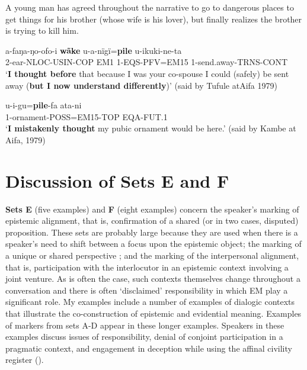 \documentclass[output=paper]{langsci/langscibook}
\begin{document}
A young man has agreed throughout the narrative to go to dangerous places to get things  for his brother (whose wife is his lover), but finally realizes the brother is trying to kill him. 

\begin{exe}
	\ex \label{ex:eb38}
	\gll a-faŋa-ŋo-ofo-i \textbf{wãke} u-a-nïgï=\textbf{pile} u-ikuki-ne-ta\\ %
	2-ear-NLOC-USIN-COP EM1 1-EQS-PFV=EM15 1-send.away-TRNS-CONT\\
	\trans ‘\textbf{I thought before} that because I was your co-spouse I could (safely) be sent away (\textbf{but I now understand differently})’ (said by Tufule atAifa 1979)
\end{exe}

\begin{exe}
	\ex
	\gll u-i-gu=\textbf{pile}-fa ata-ni\\
	1-ornament-POSS=EM15-TOP EQA-FUT.1\\
	\trans ‘\textbf{I mistakenly thought} my pubic ornament would be here.’ (said by Kambe at Aifa, 1979)
\end{exe}


\section{Discussion of Sets E and F}\label{s:eb4}

\textbf{Sets E} (five examples) and \textbf{F} (eight examples) concern the speaker’s marking of epistemic alignment, that is,  confirmation of a shared (or in two cases, disputed) proposition.  These sets are probably large because they are used when there is a speaker’s need to shift between a focus upon the epistemic object; the marking of a unique or shared perspective ; and the marking of the interpersonal alignment,  that is, participation with the interlocutor in an epistemic context involving a joint venture.  As is often the case, such contexts themselves change throughout  a conversation and there is often ‘disclaimed’ responsibility in which EM play a significant role.  My examples include a number of examples of dialogic contexts that illustrate the  co-construction of epistemic and evidential meaning.  Examples of markers from sets A-D appear in these longer examples. Speakers in these examples discuss issues of responsibility, denial of conjoint participation in a pragmatic context, and engagement in deception while using the affinal civility register (\citealt{Basso2007}).
\end{document}

